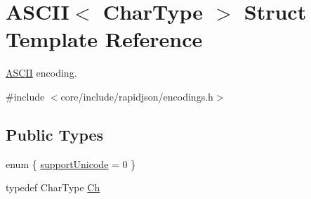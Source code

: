 \hypertarget{structASCII}{}\section{A\+S\+C\+II$<$ Char\+Type $>$ Struct Template Reference}
\label{structASCII}


\hyperlink{structASCII}{A\+S\+C\+II} encoding.  




{\ttfamily \#include $<$core/include/rapidjson/encodings.\+h$>$}

\subsection*{Public Types}
\begin{DoxyCompactItemize}
\item 
enum \{ \hyperlink{structASCII_a2f2c796586b1f9b18c7ff5c452eba0a9a672ec36bd3404c3050a9111a934cbe00}{support\+Unicode} = 0
 \}
\item 
typedef Char\+Type \hyperlink{structASCII_a1baf6e7914f165be952c30db664cefb4}{Ch}
\end{DoxyCompactItemize}

